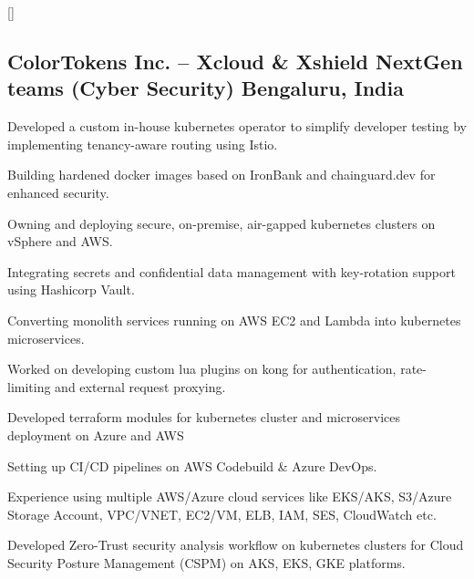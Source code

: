 \titlespacing*{\subsubsection}{0em}{0em}{0em}
\titleformat{\subsubsection}{\itshape}{}{0em}{}[]


\subsection{ColorTokens Inc. -- Xcloud \& Xshield NextGen teams (Cyber Security) \hfill Bengaluru, India}
\begin{zitemize}
    \item Developed a custom in-house kubernetes operator to simplify developer testing by implementing tenancy-aware routing using Istio.
    \item Building hardened docker images based on IronBank and chainguard.dev for enhanced security.
    \item Owning and deploying secure, on-premise, air-gapped kubernetes clusters on vSphere and AWS.
    \item Integrating secrets and confidential data management with key-rotation support using Hashicorp Vault.
    \item Converting monolith services running on AWS EC2 and Lambda into kubernetes microservices.
    \item Worked on developing custom lua plugins on kong for authentication, rate-limiting and external request proxying.
    \item Developed terraform modules for kubernetes cluster and microservices deployment on Azure and AWS
    \item Setting up CI/CD pipelines on AWS Codebuild \& Azure DevOps.
    \item Experience using multiple AWS/Azure cloud services like EKS/AKS, S3/Azure Storage Account, VPC/VNET, EC2/VM, ELB, IAM, SES, CloudWatch etc.
    \item Developed Zero-Trust security analysis workflow on kubernetes clusters for Cloud Security Posture Management (CSPM) on AKS, EKS, GKE platforms.
\end{zitemize}


